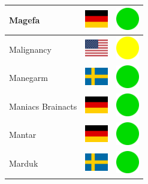 \documentclass[12pt, a4paper, twoside]{report}
\begin{document}
\begin{center}
\begin{longtable}{|p{5cm}|p{2cm}|p{2cm}|}
 Magefa                                                     & \includegraphics[width=1cm]{../4x3/de} &   \includegraphics[width=1cm]{../likes/y} \\ \hline
 Malignancy                                                 & \includegraphics[width=1cm]{../4x3/us} &   \includegraphics[width=1cm]{../likes/m} \\ \hline
 Manegarm                                                   & \includegraphics[width=1cm]{../4x3/se} &   \includegraphics[width=1cm]{../likes/y} \\ \hline
 Maniacs Brainacts                                          & \includegraphics[width=1cm]{../4x3/de} &   \includegraphics[width=1cm]{../likes/y} \\ \hline
 Mantar                                                     & \includegraphics[width=1cm]{../4x3/de} &   \includegraphics[width=1cm]{../likes/y} \\ \hline
 Marduk                                                     & \includegraphics[width=1cm]{../4x3/se} &   \includegraphics[width=1cm]{../likes/y} \\ \hline

\end{longtable}
\end{center}
\end{document}
